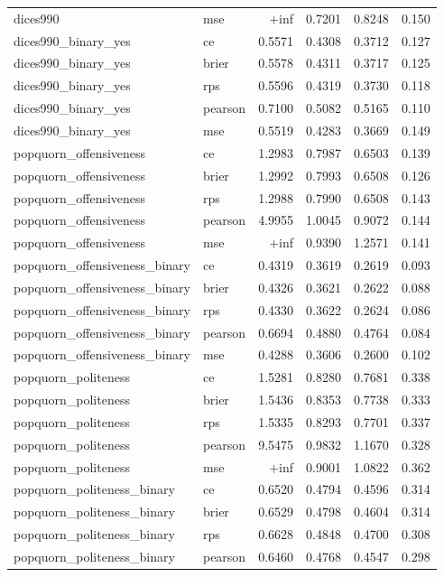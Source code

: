 \begin{tabular}{llrrrr}
dices990 & mse & +inf & 0.7201 & 0.8248 & 0.150 \\
dices990_binary_yes & ce & 0.5571 & 0.4308 & 0.3712 & 0.127 \\
dices990_binary_yes & brier & 0.5578 & 0.4311 & 0.3717 & 0.125 \\
dices990_binary_yes & rps & 0.5596 & 0.4319 & 0.3730 & 0.118 \\
dices990_binary_yes & pearson & 0.7100 & 0.5082 & 0.5165 & 0.110 \\
dices990_binary_yes & mse & 0.5519 & 0.4283 & 0.3669 & 0.149 \\
popquorn_offensiveness & ce & 1.2983 & 0.7987 & 0.6503 & 0.139 \\
popquorn_offensiveness & brier & 1.2992 & 0.7993 & 0.6508 & 0.126 \\
popquorn_offensiveness & rps & 1.2988 & 0.7990 & 0.6508 & 0.143 \\
popquorn_offensiveness & pearson & 4.9955 & 1.0045 & 0.9072 & 0.144 \\
popquorn_offensiveness & mse & +inf & 0.9390 & 1.2571 & 0.141 \\
popquorn_offensiveness_binary & ce & 0.4319 & 0.3619 & 0.2619 & 0.093 \\
popquorn_offensiveness_binary & brier & 0.4326 & 0.3621 & 0.2622 & 0.088 \\
popquorn_offensiveness_binary & rps & 0.4330 & 0.3622 & 0.2624 & 0.086 \\
popquorn_offensiveness_binary & pearson & 0.6694 & 0.4880 & 0.4764 & 0.084 \\
popquorn_offensiveness_binary & mse & 0.4288 & 0.3606 & 0.2600 & 0.102 \\
popquorn_politeness & ce & 1.5281 & 0.8280 & 0.7681 & 0.338 \\
popquorn_politeness & brier & 1.5436 & 0.8353 & 0.7738 & 0.333 \\
popquorn_politeness & rps & 1.5335 & 0.8293 & 0.7701 & 0.337 \\
popquorn_politeness & pearson & 9.5475 & 0.9832 & 1.1670 & 0.328 \\
popquorn_politeness & mse & +inf & 0.9001 & 1.0822 & 0.362 \\
popquorn_politeness_binary & ce & 0.6520 & 0.4794 & 0.4596 & 0.314 \\
popquorn_politeness_binary & brier & 0.6529 & 0.4798 & 0.4604 & 0.314 \\
popquorn_politeness_binary & rps & 0.6628 & 0.4848 & 0.4700 & 0.308 \\
popquorn_politeness_binary & pearson & 0.6460 & 0.4768 & 0.4547 & 0.298 \\

\end{tabular}
